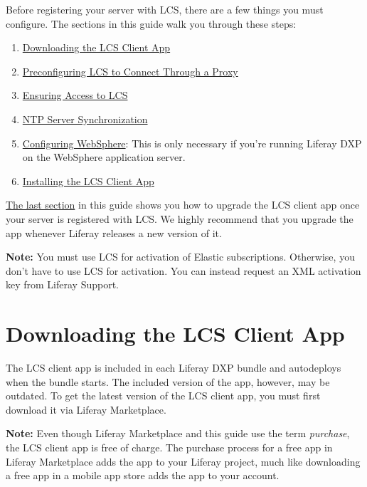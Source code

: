 \noindent\hrulefill

Before registering your server with LCS, there are a few things you must
configure. The sections in this guide walk you through these steps:

\begin{enumerate}
\def\labelenumi{\arabic{enumi}.}
\tightlist
\item
  \hyperref[downloading-the-lcs-client-app]{Downloading the LCS Client
  App}
\item
  \hyperref[preconfiguring-lcs-to-connect-through-a-proxy]{Preconfiguring
  LCS to Connect Through a Proxy}
\item
  \hyperref[ensuring-access-to-lcs]{Ensuring Access to LCS}
\item
  \hyperref[ntp-server-synchronization]{NTP Server Synchronization}
\item
  \hyperref[configuring-websphere]{Configuring WebSphere}: This is only
  necessary if you're running Liferay DXP on the WebSphere application
  server.
\item
  \hyperref[installing-the-lcs-client-app]{Installing the LCS Client
  App}
\end{enumerate}

\hyperref[upgrading-the-lcs-client-app]{The last section} in this guide
shows you how to upgrade the LCS client app once your server is
registered with LCS. We highly recommend that you upgrade the app
whenever Liferay releases a new version of it.

\noindent\hrulefill

\textbf{Note:} You must use LCS for activation of Elastic subscriptions.
Otherwise, you don't have to use LCS for activation. You can instead
request an XML activation key from Liferay Support.

\noindent\hrulefill

\section{Downloading the LCS Client
App}\label{downloading-the-lcs-client-app}

The LCS client app is included in each Liferay DXP bundle and
autodeploys when the bundle starts. The included version of the app,
however, may be outdated. To get the latest version of the LCS client
app, you must first download it via Liferay Marketplace.

\noindent\hrulefill

\textbf{Note:} Even though Liferay Marketplace and this guide use the
term \emph{purchase}, the LCS client app is free of charge. The purchase
process for a free app in Liferay Marketplace adds the app to your
Liferay project, much like downloading a free app in a mobile app store
adds the app to your account.

